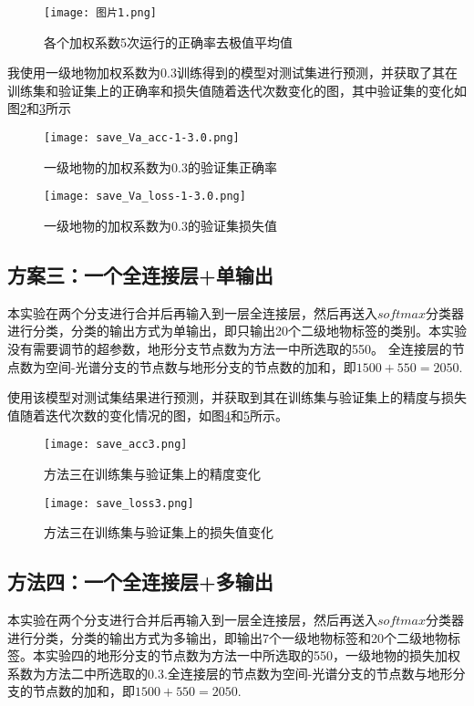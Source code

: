 \documentclass[lang=cn,11pt,a4paper,cite=authoryear]{elegantpaper}
\begin{document}
\begin{figure}[!htb]
  \centering
  \texttt{[image: 图片1.png]}
  \caption{各个加权系数5次运行的正确率去极值平均值}
  \label{fig:shiyanshu2qujizhi}
\end{figure}

我使用一级地物加权系数为0.3训练得到的模型对测试集进行预测，并获取了其在训练集和验证集上的正确率和损失值随着迭代次数变化的图，其中验证集的变化如图\ref{fig:val-acc2}和\ref{fig:val-loss2}所示

\begin{figure}[!htb]
  \centering
  \texttt{[image: save\_Va\_acc-1-3.0.png]}
  \caption{一级地物的加权系数为0.3的验证集正确率}
  \label{fig:val-acc2}
\end{figure}

\begin{figure}[!htb]
  \centering
  \texttt{[image: save\_Va\_loss-1-3.0.png]}
  \caption{一级地物的加权系数为0.3的验证集损失值}
  \label{fig:val-loss2}
\end{figure}


\subsection{方案三：一个全连接层+单输出}
本实验在两个分支进行合并后再输入到一层全连接层，然后再送入$softmax$分类器进行分类，分类的输出方式为单输出，即只输出20个二级地物标签的类别。本实验没有需要调节的超参数，地形分支节点数为方法一中所选取的550。
全连接层的节点数为空间-光谱分支的节点数与地形分支的节点数的加和，即$1500+550=2050$.

使用该模型对测试集结果进行预测，并获取到其在训练集与验证集上的精度与损失值随着迭代次数的变化情况的图，如图\ref{fig:train-acc3}和\ref{fig:train-loss3}所示。

\begin{figure}[!htb]
  \centering
  \texttt{[image: save\_acc3.png]}
  \caption{方法三在训练集与验证集上的精度变化}
  \label{fig:train-acc3}
\end{figure}

\begin{figure}[!htb]
  \centering
  \texttt{[image: save\_loss3.png]}
  \caption{方法三在训练集与验证集上的损失值变化}
  \label{fig:train-loss3}
\end{figure}

\subsection{方法四：一个全连接层+多输出}
本实验在两个分支进行合并后再输入到一层全连接层，然后再送入$softmax$分类器进行分类，分类的输出方式为多输出，即输出7个一级地物标签和20个二级地物标签。本实验四的地形分支的节点数为方法一中所选取的550，一级地物的损失加权系数为方法二中所选取的0.3.全连接层的节点数为空间-光谱分支的节点数与地形分支的节点数的加和，即$1500+550=2050$.
\end{document}
